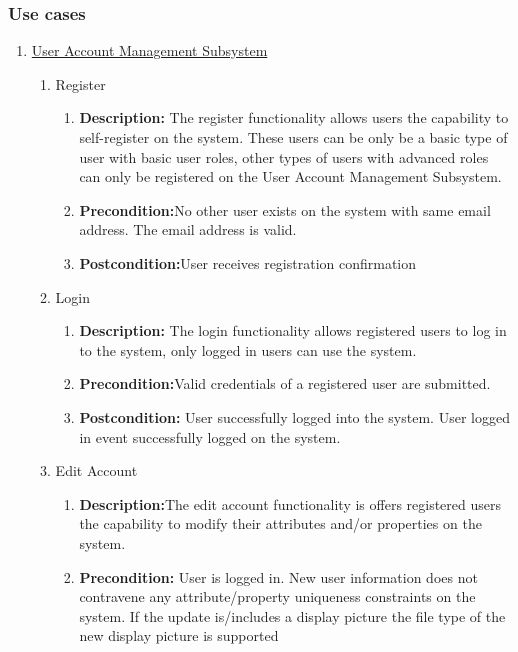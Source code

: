 \documentclass{article}
\begin{document}
	\subsubsection{Use cases}
	\begin{enumerate}
		\item \underline{User Account Management Subsystem}
			
	\begin{enumerate}
		\item Register
		\begin{enumerate}
			\item \textbf{Description:} The register functionality allows users the capability to self-register on the system. These users can be only be a basic type of user with basic user roles, other types of users with advanced roles can only be registered on the User Account Management Subsystem.
			\item \textbf{Precondition:}No other user exists on the system with same email address. The email address is valid.
			\item \textbf{Postcondition:}User receives registration confirmation\newline
		\end{enumerate}
		
		\item Login
		\begin{enumerate}
			\item \textbf{Description:}  The login functionality allows registered users to log in to the system, only logged in users can use the system.
			\item \textbf{Precondition:}Valid credentials of a registered user are submitted.
			\item \textbf{Postcondition:} User successfully logged into the system. User logged in event successfully logged on the system.\newline
		\end{enumerate}
		
		
		\item Edit Account
		\begin{enumerate}
			\item \textbf{Description:}The edit account functionality is offers registered users the capability to modify
their attributes and/or properties on the system.
			\item \textbf{Precondition:} User is logged in. New user information does not contravene any attribute/property uniqueness constraints on the system. If the update is/includes a display picture the file type of the new display picture is supported 


\end{enumerate}
\end{enumerate}
\end{enumerate}
\end{document}
